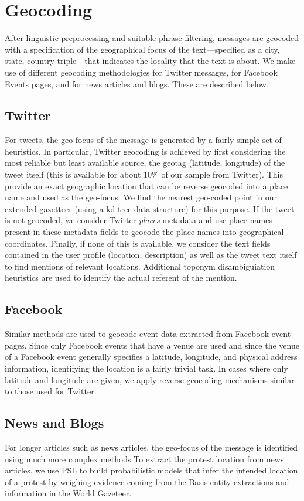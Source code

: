\section{Geocoding}
\label{subsection:geocoding}
After linguistic preprocessing and suitable phrase filtering,
messages are geocoded with a
specification of the geographical focus of the text---specified as a
city, state, country triple---that indicates the locality that the
text is about. We make use of different geocoding methodologies
for Twitter messages, for Facebook Events pages, and for news articles and blogs.
These are described below.

\subsection{Twitter}
For tweets, the geo-focus of the message is generated by a fairly
simple set of heuristics.  In particular, Twitter
geocoding is achieved by first considering the most reliable but least
available source, the geotag (latitude, longitude) of the tweet itself (this is available
for about 10\% of our sample from Twitter). This provide an exact
geographic location that can be reverse geocoded into a place name
and used as the geo-focus. We find the nearest geo-coded point in
our extended gazetteer (using a kd-tree data structure) for this
purpose. If the tweet is not geocoded, we consider Twitter {\it places}
metadata and use place names present in these metadata fields to
geocode the place names into geographical coordinates. Finally, if
none of this is available, we consider the text fields contained in
the user profile (location, description) as well as the tweet text
itself to find mentions of relevant locations.  Additional toponym disambiguiation heuristics are used to
identify the actual referent of the mention.

\subsection{Facebook}
Similar methods are used to geocode event data extracted from Facebook event pages.  
Since only Facebook events that have a venue are used and since the
 venue of a Facebook event generally specifies a latitude, longitude, and physical address information, 
identifying the location is a fairly trivial task.  In cases where only latitude and longitude are given, 
we apply reverse-geocoding mechanisms similar to those used for Twitter.

\subsection{News and Blogs}
For longer articles such as news articles, the geo-focus of the message is identified using much more complex methods
To extract the protest location from news articles, we use PSL to build probabilistic models that infer the intended
location of a protest by 
weighing evidence coming from the Basis entity extractions and information in the World Gazeteer. 

